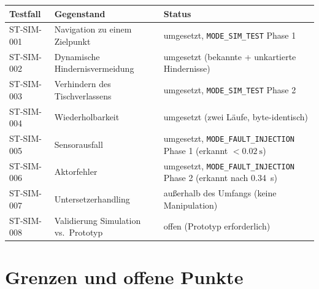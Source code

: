 \documentclass[
  a4paper,
  12pt,
  DIV=12,        %
  parskip=half,  %
  headings=small %
]{scrartcl}
\theoremstyle{definition}
\theoremstyle{definition}
\begin{document}
\begin{longtable}[]{@{}p{}p{}p{}@{}}
\toprule
\textbf{Testfall} & \textbf{Gegenstand} & \textbf{Status}\\
\midrule
\endhead
ST-SIM-001 & Navigation zu einem Zielpunkt & umgesetzt, \texttt{MODE\_SIM\_TEST} Phase 1\\
ST-SIM-002 & Dynamische Hindernisvermeidung & umgesetzt (bekannte + unkartierte Hindernisse)\\
ST-SIM-003 & Verhindern des Tischverlassens & umgesetzt, \texttt{MODE\_SIM\_TEST} Phase 2\\
ST-SIM-004 & Wiederholbarkeit & umgesetzt (zwei Läufe, byte-identisch)\\
ST-SIM-005 & Sensorausfall & umgesetzt, \texttt{MODE\_FAULT\_INJECTION} Phase 1 (erkannt $<\SI{0.02}{\second}$)\\
ST-SIM-006 & Aktorfehler & umgesetzt, \texttt{MODE\_FAULT\_INJECTION} Phase 2 (erkannt nach \SI{0.34}{\second})\\
ST-SIM-007 & Untersetzerhandling & außerhalb des Umfangs (keine Manipulation)\\
ST-SIM-008 & Validierung Simulation vs.\ Prototyp & offen (Prototyp erforderlich)\\
\bottomrule
\end{longtable}

\section{Grenzen und offene Punkte}\label{grenzen}
\end{document}
